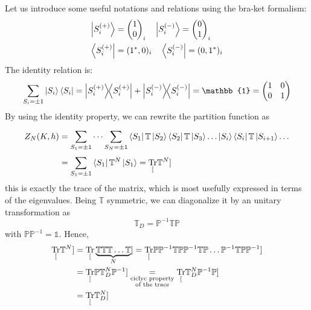 \documentclass[../../Main/Main.tex]{subfiles}
\begin{document}
Let us introduce some useful notations and relations using the bra-ket formalism:
\begin{subequations}
\begin{align}
  \ket{S_i^{(+)}} &= \begin{pmatrix}
  1 \\
  0
  \end{pmatrix}_i
  \quad
  \ket{S_i^{(-)}} = \begin{pmatrix}
  0 \\
  1
  \end{pmatrix}_i   \\
  \bra{S_i^{(+)}} &= (1^*,0)_i \quad   \bra{S_i^{(-)}} = (0,1^*)_i
\end{align}
\end{subequations}
The identity relation is:
\begin{equation}
  \sum_{S_i = \pm 1}^{}  \ket{S_i} \bra{S_i} =
  \ketbra{S_i^{(+)}}{S_i^{(+)}} + \ketbra{S_i^{(-)}}{S_i^{(-)}}
  =\mathbb{1} = \begin{pmatrix}
  1   & 0 \\
  0   & 1
  \end{pmatrix}
\end{equation}
By using the identity property, we can rewrite the partition function as 
\begin{equation}
  \begin{split}
   Z_N (K,h) &= \sum_{S_1 = \pm 1}^{} \dots \sum_{S_N = \pm 1}^{} \bra{S_1} \mathbb{T} \ket{S_2} \bra{S_2}  \mathbb{T} \ket{S_3} \dots \ket{S_i} \bra{S_i}  \mathbb{T} \ket{S_{i+1}} \dots \\
   & = \sum_{S_1 = \pm 1}^{}  \bra{S_1}  \mathbb{T}^N \ket{S_1} = \underset{[}{\text{Tr}}\mathbb{T}^N]
     \end{split}
\end{equation}
this is exactly the trace of the matrix, which is most usefully expressed in terms of the eigenvalues. Being \( \mathbb{T} \) symmetric, we can diagonalize it by an unitary transformation as
\begin{equation}
   \mathbb{T}_D = \mathbb{P}^{-1} \mathbb{T} \mathbb{P}
\end{equation}
with \( \mathbb{P} \mathbb{P}^{-1} = \mathbb{1} \). Hence,
\begin{equation*}
\begin{split}
  \underset{[}{\text{Tr}}\mathbb{T}^N] &= \underset{[}{\text{Tr}}\underbrace{\mathbb{T} \mathbb{T} \mathbb{T} \dots \mathbb{T}}_{N} ] = \underset{[}{\text{Tr}} \mathbb{P} \mathbb{P}^{-1} \mathbb{T} \mathbb{P} \mathbb{P}^{-1} \mathbb{T} \mathbb{P} \dots \mathbb{P}^{-1}  \mathbb{T} \mathbb{P} \mathbb{P}^{-1} ]    \\
  & = \underset{[}{\text{Tr}} \mathbb{P} \mathbb{T}_D^N \mathbb{P}^{-1}] \underset{\substack{ \text{ciclyc property} \\  \text{of the trace} } }{=} \underset{[}{\text{Tr}} \mathbb{T}_D^N \mathbb{P}^{-1} \mathbb{P} ]\\
  & = \underset{[}{\text{Tr}} \mathbb{T}_D^N]
\end{split}
\end{equation*}
\end{document}
